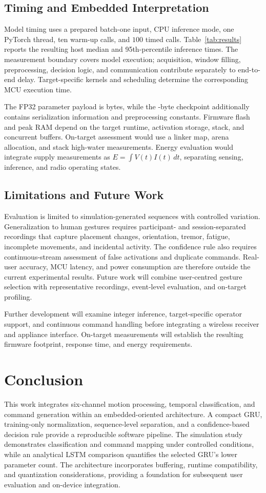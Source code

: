 \documentclass[conference]{IEEEtran}
\begin{document}
\subsection{Timing and Embedded Interpretation}
Model timing uses a prepared batch-one input, CPU inference mode, one PyTorch thread, ten warm-up calls, and $100$ timed calls. Table~\ref{tab:results} reports the resulting host median and 95th-percentile inference times. The measurement boundary covers model execution; acquisition, window filling, preprocessing, decision logic, and communication contribute separately to end-to-end delay. Target-specific kernels and scheduling determine the corresponding MCU execution time.

The FP32 parameter payload is \WeightBytes{} bytes, while the \CheckpointBytes{}-byte checkpoint additionally contains serialization information and preprocessing constants. Firmware flash and peak RAM depend on the target runtime, activation storage, stack, and concurrent buffers. On-target assessment would use a linker map, arena allocation, and stack high-water measurements. Energy evaluation would integrate supply measurements as $E=\int V(t)I(t)\,dt$, separating sensing, inference, and radio operating states.

\subsection{Limitations and Future Work}
Evaluation is limited to simulation-generated sequences with controlled variation. Generalization to human gestures requires participant- and session-separated recordings that capture placement changes, orientation, tremor, fatigue, incomplete movements, and incidental activity. The confidence rule also requires continuous-stream assessment of false activations and duplicate commands. Real-user accuracy, MCU latency, and power consumption are therefore outside the current experimental results. Future work will combine user-centred gesture selection with representative recordings, event-level evaluation, and on-target profiling.

Further development will examine integer inference, target-specific operator support, and continuous command handling before integrating a wireless receiver and appliance interface. On-target measurements will establish the resulting firmware footprint, response time, and energy requirements.

\section{Conclusion}
This work integrates six-channel motion processing, temporal classification, and command generation within an embedded-oriented architecture. A compact GRU, training-only normalization, sequence-level separation, and a confidence-based decision rule provide a reproducible software pipeline. The simulation study demonstrates classification and command mapping under controlled conditions, while an analytical LSTM comparison quantifies the selected GRU's lower parameter count. The architecture incorporates buffering, runtime compatibility, and quantization considerations, providing a foundation for subsequent user evaluation and on-device integration.



\end{document}
